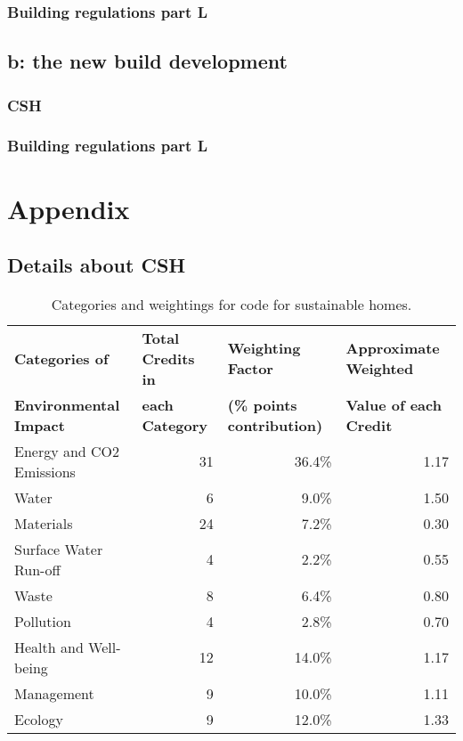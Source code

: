 \documentclass[a4paper,fleqn]{article}
\let\stdsection\section
\renewcommand{\section}{\newpage\stdsection}
\renewcommand{\cite}{\citep}
\begin{document}
\subsubsection*{Building regulations part L}


\subsection*{b: the new build development}
\subsubsection*{CSH}


\subsubsection*{Building regulations part L}




\appendix

\section{Appendix}

\subsection{Details about CSH}
\begin{table}[H]
	\begin{center}
		\begin{tabular}{| l | r | r | r |}
		\hline
			\multicolumn{1}{|l|}{\textbf{Categories of}} & \multicolumn{1}{l|}{\textbf{Total Credits in}} & 
				\multicolumn{1}{l|}{\textbf{Weighting Factor}} & \multicolumn{1}{l|}{\textbf{Approximate Weighted}}\\
			\multicolumn{1}{|l|}{\textbf{Environmental Impact}} & \multicolumn{1}{l|}{\textbf{each Category}} & 
				\multicolumn{1}{l|}{\textbf{(\% points contribution)}} & \multicolumn{1}{l|}{\textbf{Value of each Credit}}\\
			\hline
			Energy and CO2 Emissions & 31 & 36.4\% & 1.17\\
			\hline
			Water & 6 & 9.0\% & 1.50\\
			\hline
			Materials & 24 & 7.2\% & 0.30\\
			\hline
			Surface Water Run-off & 4 & 2.2\% & 0.55\\
			\hline
			Waste & 8 & 6.4\% & 0.80\\
			\hline
			Pollution & 4 & 2.8\% & 0.70\\
			\hline
			Health and Well-being & 12 & 14.0\% & 1.17\\
			\hline
			Management & 9 & 10.0\% & 1.11\\
			\hline
			Ecology & 9 & 12.0\% & 1.33\\
			\hline
		\end{tabular}
	\caption{Categories and weightings for code for sustainable homes. \cite{Communities&LocalGovernment2010d}}
	\label{tab:cshWeighting}
	\end{center}
\end{table}
\end{document}
